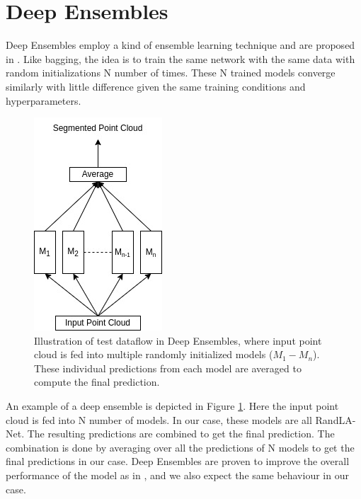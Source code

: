 \section{Deep Ensembles}
\label{sec:meth_deepensembles}
Deep Ensembles employ a kind of ensemble learning technique and are proposed in \cite{lakshminarayanan2016simple}.
Like bagging, the idea is to train the same network with the same data with random initializations N number of times.
These N trained models converge similarly with little difference given the same training conditions and hyperparameters.
\begin{figure}
    \centering
    \includegraphics[scale=0.4]{images/DE.jpg}
    \caption{Illustration of test dataflow in Deep Ensembles, where input point cloud is fed into multiple randomly initialized models ($M_1-M_n$). 
    These individual predictions from each model are averaged to compute the final prediction.}
    \label{fig:deepensembles}
\end{figure}
An example of a deep ensemble is depicted in Figure \ref{fig:deepensembles}.
Here the input point cloud is fed into N number of models. In our case, these models are all RandLA-Net.
The resulting predictions are combined to get the final prediction. 
The combination is done by averaging over all the predictions of N models to get the final predictions in our case.
Deep Ensembles are proven to improve the overall performance of the model as in \cite{bhandary2020evaluating}, and we also expect the same behaviour in our case.

